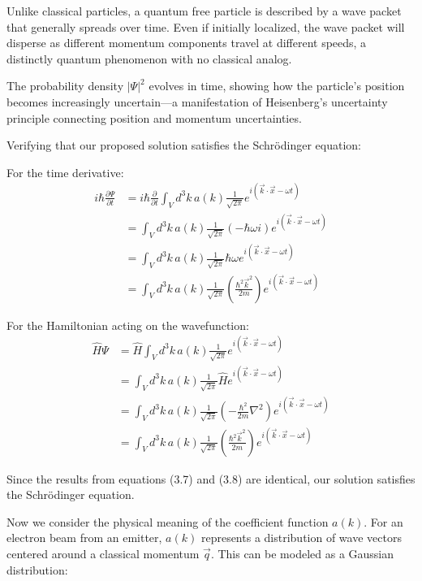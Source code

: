 \documentclass[italian]{HKNdocument}
\begin{document}
Unlike classical particles, a quantum free particle is described by a wave packet that generally spreads over time. Even if initially localized, the wave packet will disperse as different momentum components travel at different speeds, a distinctly quantum phenomenon with no classical analog.

The probability density $|\Psi|^2$ evolves in time, showing how the particle's position becomes increasingly uncertain—a manifestation of Heisenberg's uncertainty principle connecting position and momentum uncertainties.


Verifying that our proposed solution satisfies the Schrödinger equation:

For the time derivative:
\begin{align*}
i\hbar\frac{\partial\Psi}{\partial t} &= i\hbar\frac{\partial}{\partial t}\int_V d^3k\,a(k)\frac{1}{\sqrt{2\pi}}e^{i(\vec{k}\cdot\vec{x}-\omega t)} \\
&= \int_V d^3k\,a(k)\frac{1}{\sqrt{2\pi}}(-\hbar\omega i)e^{i(\vec{k}\cdot\vec{x}-\omega t)} \\
&= \int_V d^3k\,a(k)\frac{1}{\sqrt{2\pi}}\hbar\omega e^{i(\vec{k}\cdot\vec{x}-\omega t)} \tag{3.7} \\
&= \int_V d^3k\,a(k)\frac{1}{\sqrt{2\pi}}\left(\frac{\hbar^2\vec{k}^2}{2m}\right)e^{i(\vec{k}\cdot\vec{x}-\omega t)}
\end{align*}

For the Hamiltonian acting on the wavefunction:
\begin{align*}
\hat{H}\Psi &= \hat{H}\int_V d^3k\,a(k)\frac{1}{\sqrt{2\pi}}e^{i(\vec{k}\cdot\vec{x}-\omega t)} \\
&= \int_V d^3k\,a(k)\frac{1}{\sqrt{2\pi}}\hat{H}e^{i(\vec{k}\cdot\vec{x}-\omega t)} \\
&= \int_V d^3k\,a(k)\frac{1}{\sqrt{2\pi}}\left(-\frac{\hbar^2}{2m}\nabla^2\right)e^{i(\vec{k}\cdot\vec{x}-\omega t)} \tag{3.8} \\
&= \int_V d^3k\,a(k)\frac{1}{\sqrt{2\pi}}\left(\frac{\hbar^2\vec{k}^2}{2m}\right)e^{i(\vec{k}\cdot\vec{x}-\omega t)}
\end{align*}

Since the results from equations (3.7) and (3.8) are identical, our solution satisfies the Schrödinger equation.

Now we consider the physical meaning of the coefficient function $a(k)$. For an electron beam from an emitter, $a(k)$ represents a distribution of wave vectors centered around a classical momentum $\vec{q}$. This can be modeled as a Gaussian distribution:
\end{document}
